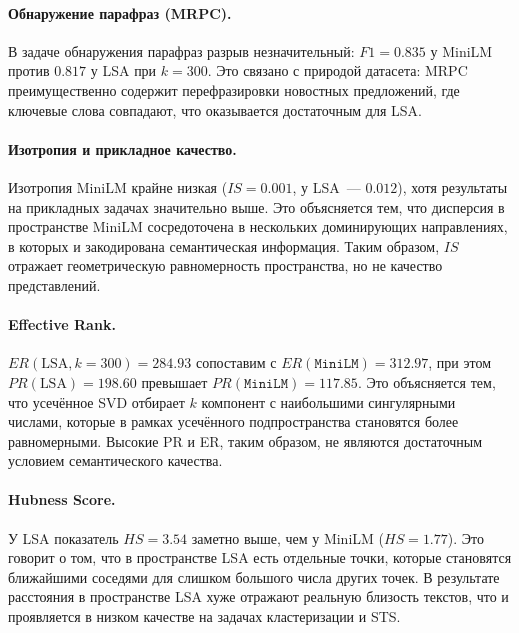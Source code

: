 \paragraph{Обнаружение парафраз (MRPC).}
В задаче обнаружения парафраз разрыв незначительный: $F1 = 0.835$ у
MiniLM против $0.817$ у LSA при $k = 300$. Это связано с природой
датасета: MRPC преимущественно содержит перефразировки новостных
предложений, где ключевые слова совпадают, что оказывается достаточным
для LSA.

\paragraph{Изотропия и прикладное качество.}
Изотропия MiniLM крайне низкая ($IS = 0.001$, у LSA~--- $0.012$), хотя
результаты на прикладных задачах значительно выше. Это объясняется тем,
что дисперсия в пространстве MiniLM сосредоточена в нескольких
доминирующих направлениях, в которых и закодирована семантическая
информация. Таким образом, $IS$ отражает геометрическую равномерность
пространства, но не качество представлений.

\paragraph{Effective Rank.}
\begin{sloppypar}
$ER(\text{LSA}, k{=}300) = 284.93$ сопоставим с $ER(\texttt{MiniLM}) =
312.97$, при этом $PR(\text{LSA}) = 198.60$ превышает
$PR(\texttt{MiniLM}) = 117.85$. Это объясняется тем, что усечённое SVD
отбирает $k$ компонент с наибольшими сингулярными числами, которые
в рамках усечённого подпространства становятся более равномерными.
Высокие PR и ER, таким образом, не являются достаточным условием
семантического качества.
\end{sloppypar}



\paragraph{Hubness Score.}
У LSA показатель $HS = 3.54$ заметно выше, чем у MiniLM ($HS =
1.77$). Это говорит о том, что в пространстве LSA есть отдельные
точки, которые становятся ближайшими соседями для слишком большого
числа других точек. В результате расстояния в пространстве LSA хуже
отражают реальную близость текстов, что и проявляется в низком
качестве на задачах кластеризации и STS.

